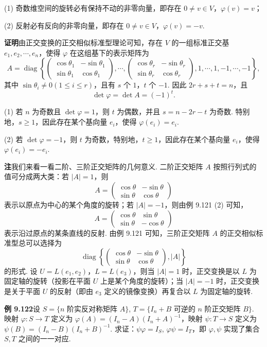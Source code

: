 \documentclass[UTF8, 12pt, fontset=fandol, oneside]{ctexart}
\begin{document}
(1) 奇数维空间的旋转必有保持不动的非零向量，即存在 $0\ne v\in V$，$\varphi(v)=v$；

(2) 反射必有反向的非零向量，即存在 $0\ne v\in V$，$\varphi(v)=-v$.

\noindent\textbf{证明}\quad 由正交变换的正交相似标准型理论可知，存在 $V$ 的一组标准正交基 $e_1,e_2,\cdots,e_n$，使得 $\varphi$ 在这组基下的表示矩阵为
\[
A=\operatorname{diag}\left\{
\begin{pmatrix}
\cos\theta_1&-\sin\theta_1\\
\sin\theta_1&\cos\theta_1
\end{pmatrix},\cdots,
\begin{pmatrix}
\cos\theta_r&-\sin\theta_r\\
\sin\theta_r&\cos\theta_r
\end{pmatrix},
1,\cdots,1,-1,\cdots,-1
\right\},
\]
其中 $\sin\theta_i\ne0(1\le i\le r)$，且有 $s$ 个 $1$，$t$ 个 $-1$. 因此 $2r+s+t=n$，且
\[
\det\varphi=\det A=(-1)^t.
\]

(1) 若 $n$ 为奇数且 $\det\varphi=1$，则 $t$ 为偶数，并且 $s=n-2r-t$ 为奇数. 特别地，$s\ge1$，因此存在某个基向量 $e_i$，使得 $\varphi(e_i)=e_i$.

(2) 若 $\det\varphi=-1$，则 $t$ 为奇数，特别地，$t\ge1$，因此存在某个基向量 $e_i$，使得 $\varphi(e_i)=-e_i$.

\noindent\textbf{注}\quad 我们来看一看二阶、三阶正交矩阵的几何意义. 二阶正交矩阵 $A$ 按照行列式的值可分成两大类：若 $|A|=1$，则
\[
A=\begin{pmatrix}
\cos\theta&-\sin\theta\\
\sin\theta&\cos\theta
\end{pmatrix}
\]
表示以原点为中心的某个角度的旋转；若 $|A|=-1$，则由例 9.121 (2) 可知，
\[
A=\begin{pmatrix}
\cos\theta&\sin\theta\\
\sin\theta&-\cos\theta
\end{pmatrix}
\]
表示沿过原点的某条直线的反射. 由例 9.121 可知，三阶正交矩阵 $A$ 的正交相似标准型总可以选择为
\[
\operatorname{diag}\left\{
\begin{pmatrix}
\cos\theta&-\sin\theta\\
\sin\theta&\cos\theta
\end{pmatrix},
|A|
\right\}
\]
的形式. 设 $U=L(e_1,e_2)$，$L=L(e_3)$，则当 $|A|=1$ 时，正交变换是以 $L$ 为固定轴的旋转（投影在平面 $U$ 上是某个角度的旋转）；当 $|A|=-1$ 时，正交变换是关于平面 $U$ 的反射（即由 $e_3$ 定义的镜像变换）再复合以 $L$ 为固定轴的旋转.

\noindent\textbf{例 9.122}\quad 设 $S=\{n\text{ 阶实反对称矩阵 }A\}$, $T=\{I_n+B\text{ 可逆的 }n\text{ 阶正交矩阵 }B\}$. 映射 $\varphi:S\to T$ 定义为 $\varphi(A)=(I_n-A)(I_n+A)^{-1}$，映射 $\psi:T\to S$ 定义为 $\psi(B)=(I_n-B)(I_n+B)^{-1}$. 求证：$\psi\varphi=I_S$, $\varphi\psi=I_T$，即 $\varphi,\psi$ 实现了集合 $S,T$ 之间的一一对应.
\end{document}
